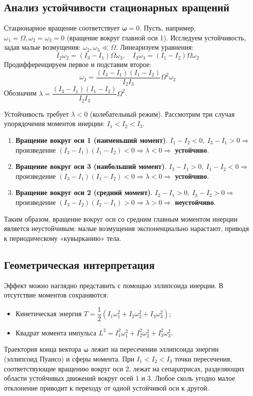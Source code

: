 \documentclass[12pt, a4paper]{article}
\begin{document}
\subsection{Анализ устойчивости стационарных вращений}
Стационарное вращение соответствует $\dot{\boldsymbol{\omega}} = 0$. Пусть, например, $\omega_1 = \Omega, \omega_2 = \omega_3 = 0$ (вращение вокруг главной оси 1). Исследуем устойчивость, задав малые возмущения: $\omega_2, \omega_3 \ll \Omega$. Линеаризуем уравнения:
\[
I_2 \dot{\omega}_2 = (I_3 - I_1) \Omega \omega_3, \quad I_3 \dot{\omega}_3 = (I_1 - I_2) \Omega \omega_2
\]
Продифференцируем первое и подставим второе:
\[
\ddot{\omega}_2 = \frac{(I_3 - I_1)(I_1 - I_2)}{I_2 I_3} \Omega^2 \omega_2
\]
Обозначим $\lambda = \dfrac{(I_3 - I_1)(I_1 - I_2)}{I_2 I_3} \Omega^2$.

Устойчивость требует $\lambda < 0$ (колебательный режим).
Рассмотрим три случая упорядочения моментов инерции: $I_1 < I_2 < I_3$.

\begin{enumerate}
    \item \textbf{Вращение вокруг оси 1 (наименьший момент)}.  
    $I_1 - I_2 < 0,\ I_3 - I_1 > 0 \Rightarrow$ произведение $(I_3 - I_1)(I_1 - I_2) < 0 \Rightarrow \lambda < 0 \Rightarrow$ \textbf{устойчиво}.
    
    \item \textbf{Вращение вокруг оси 3 (наибольший момент)}.  
    $I_3 - I_1 > 0,\ I_1 - I_2 < 0 \Rightarrow$ произведение $(I_3 - I_1)(I_1 - I_2) < 0 \Rightarrow \lambda < 0 \Rightarrow$ \textbf{устойчиво}.
    
    \item \textbf{Вращение вокруг оси 2 (средний момент)}.  
    $I_2 - I_1 > 0,\ I_3 - I_2 > 0 \Rightarrow$ произведение $(I_3 - I_2)(I_2 - I_1) > 0 \Rightarrow \lambda > 0 \Rightarrow$ \textbf{неустойчиво}.
\end{enumerate}

Таким образом, вращение вокруг оси со средним главным моментом инерции является неустойчивым: малые возмущения экспоненциально нарастают, приводя к периодическому «кувырканию» тела.

\subsection{Геометрическая интерпретация}
Эффект можно наглядно представить с помощью эллипсоида инерции. В отсутствие моментов сохраняются:
\begin{itemize}
    \item Кинетическая энергия $T = \dfrac{1}{2} (I_1 \omega_1^2 + I_2 \omega_2^2 + I_3 \omega_3^2)$;
    \item Квадрат момента импульса $L^2 = I_1^2 \omega_1^2 + I_2^2 \omega_2^2 + I_3^2 \omega_3^2$.
\end{itemize}
Траектория конца вектора $\boldsymbol{\omega}$ лежит на пересечении эллипсоида энергии (эллипсоид Пуансо) и сферы момента. При $I_1 < I_2 < I_3$ точки пересечения, соответствующие вращению вокруг оси 2, лежат на сепаратрисах, разделяющих области устойчивых движений вокруг осей 1 и 3. Любое сколь угодно малое отклонение приводит к переходу от одной устойчивой оси к другой.
\end{document}
